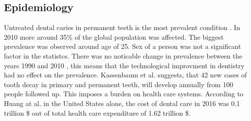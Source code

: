 \subsection{Epidemiology}
Untreated dental caries in permanent teeth is the most prevalent condition \cite{Kassebaum2015}. In 2010 more around 35\% of the global population was affected. The biggest prevalence was observed around age of 25. Sex of a person was not a significant factor in the statistcs. There was no noticable change in prevalence between the years 1990 and 2010 \cite{Kassebaum2015} \cite{Frencken2017}, this means that the technological improvment in dentistry had no effect on the prevalence.
Kassenbaum et al. suggests, that 42 new cases of tooth decay in primary and permanent teeth, will develop annually from 100 people followed up. This imposes a burden on health care systems. According to Huang at al. \cite{Hung2020} in the United States alone, the cost of dental care in 2016 was 0.1 trillion \$ out of total health care expenditure of 1.62 trillion \$.